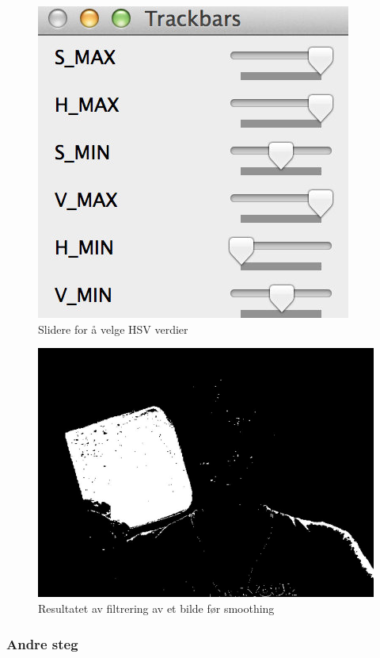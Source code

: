 \begin{figure}[h!]
	\centering
	\includegraphics[scale=0.45]{img/sliders.jpg}
	\caption{Slidere for å velge HSV verdier}
	\label{fig:sliders}
\end{figure}

\begin{figure}[h!]
	\centering
	\includegraphics[scale=0.45]{img/first-binary.jpg}
	\caption[Første iterasjon binært bilde]{Resultatet av filtrering av et bilde før smoothing}
	\label{fig:firstiterationbinary}
\end{figure}

\subsubsection{Andre steg}


